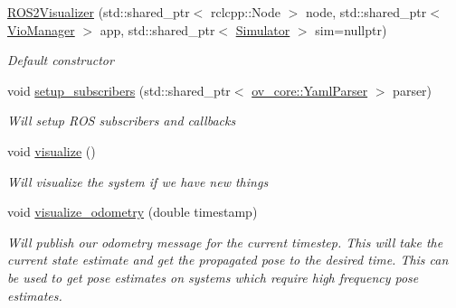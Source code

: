\begin{DoxyCompactItemize}
\item 
\hyperlink{classov__msckf_1_1ROS2Visualizer_a78a07d5b059b81b009a3c1adac36bc0b}{R\+O\+S2\+Visualizer} (std\+::shared\+\_\+ptr$<$ rclcpp\+::\+Node $>$ node, std\+::shared\+\_\+ptr$<$ \hyperlink{classov__msckf_1_1VioManager}{Vio\+Manager} $>$ app, std\+::shared\+\_\+ptr$<$ \hyperlink{classov__msckf_1_1Simulator}{Simulator} $>$ sim=nullptr)
\begin{DoxyCompactList}\small\item\em Default constructor \end{DoxyCompactList}\item 
void \hyperlink{classov__msckf_1_1ROS2Visualizer_afa4b0e1730e4fc588a09b3a6ffca55f3}{setup\+\_\+subscribers} (std\+::shared\+\_\+ptr$<$ \hyperlink{classov__core_1_1YamlParser}{ov\+\_\+core\+::\+Yaml\+Parser} $>$ parser)
\begin{DoxyCompactList}\small\item\em Will setup R\+OS subscribers and callbacks \end{DoxyCompactList}\item 
\mbox{\label{classov__msckf_1_1ROS2Visualizer_a4d8b4b52e84096d9d78fe580b99515f6}} 
void \hyperlink{classov__msckf_1_1ROS2Visualizer_a4d8b4b52e84096d9d78fe580b99515f6}{visualize} ()
\begin{DoxyCompactList}\small\item\em Will visualize the system if we have new things \end{DoxyCompactList}\item 
\mbox{\label{classov__msckf_1_1ROS2Visualizer_aae1460121f1096401c1fa1a36d9c299b}} 
void \hyperlink{classov__msckf_1_1ROS2Visualizer_aae1460121f1096401c1fa1a36d9c299b}{visualize\+\_\+odometry} (double timestamp)
\begin{DoxyCompactList}\small\item\em Will publish our odometry message for the current timestep. This will take the current state estimate and get the propagated pose to the desired time. This can be used to get pose estimates on systems which require high frequency pose estimates. \end{DoxyCompactList}\item 
\mbox{\label{classov__msckf_1_1ROS2Visualizer_a9126120133a9b4e329c55f0b84c6cf37}} 

\end{DoxyCompactItemize}
